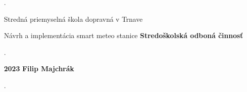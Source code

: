 \begin{titlepage}
    \phantom.
    
    \begin{center}
    {\sc\LARGE Stredná priemyselná škola dopravná v Trnave}
    \medskip
    \break
    \end {center}
    \vspace{6.5cm}
    
    
    \begin{center}
    {\sc\LARGE Návrh a implementácia smart meteo stanice}
    \break
    {\sc\LARGE\bf Stredoškolská odboná činnosť}
    
    \medskip
    \end{center}
    
    
    
    \vspace{5cm}
    
    
    
    \phantom.\hfill
    
    \vfill
    \sc\large \textbf{2023} \hfill\sc\large\textbf{ Filip Majchrák}
    
    \phantom.
    \end{titlepage}